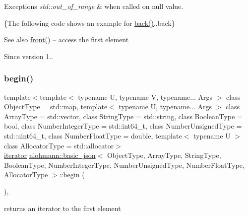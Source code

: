 \begin{DoxyExceptions}{Exceptions}
{\em std\+::out\+\_\+of\+\_\+range} & when called on {\ttfamily null} value.\\
\hline
\end{DoxyExceptions}
\{The following code shows an example for {\ttfamily \hyperlink{classnlohmann_1_1basic__json_a71b1d38ef402dfee58fba1fe01fa67f5}{back()}}.,back\}

\begin{DoxySeeAlso}{See also}
\hyperlink{classnlohmann_1_1basic__json_aa45753034bea87f9d2c0c42ace9ff75c}{front()} -- access the first element
\end{DoxySeeAlso}
\begin{DoxySince}{Since}
version 1.. 
\end{DoxySince}
\hypertarget{classnlohmann_1_1basic__json_ad4e381c54039607be08d7af41a1f6ad1}{}\label{classnlohmann_1_1basic__json_ad4e381c54039607be08d7af41a1f6ad1} 
\subsubsection{\texorpdfstring{begin()}{begin()}\hspace{0.1cm}{\footnotesize\ttfamily [1/2]}}
{\footnotesize\ttfamily template$<$template$<$ typename U, typename V, typename... Args $>$ class Object\+Type = std\+::map, template$<$ typename U, typename... Args $>$ class Array\+Type = std\+::vector, class String\+Type  = std\+::string, class Boolean\+Type  = bool, class Number\+Integer\+Type  = std\+::int64\+\_\+t, class Number\+Unsigned\+Type  = std\+::uint64\+\_\+t, class Number\+Float\+Type  = double, template$<$ typename U $>$ class Allocator\+Type = std\+::allocator$>$ \\
\hyperlink{classnlohmann_1_1basic__json_1_1iterator}{iterator} \hyperlink{classnlohmann_1_1basic__json}{nlohmann\+::basic\+\_\+json}$<$ Object\+Type, Array\+Type, String\+Type, Boolean\+Type, Number\+Integer\+Type, Number\+Unsigned\+Type, Number\+Float\+Type, Allocator\+Type $>$\+::begin (\begin{DoxyParamCaption}{ }\end{DoxyParamCaption})\hspace{0.3cm}{\ttfamily [inline]}, {\ttfamily [noexcept]}}



returns an iterator to the first element 

